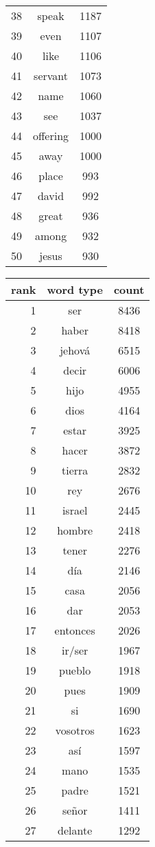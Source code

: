 \begin{figure*}
\begin{tiny}
\begin{centering}
\begin{tabular}{|r|c|c|}
38 & speak & 1187 \\
39 & even & 1107 \\
40 & like & 1106 \\
41 & servant & 1073 \\
42 & name & 1060 \\
43 & see & 1037 \\
44 & offering & 1000 \\
45 & away & 1000 \\
46 & place & 993 \\
47 & david & 992 \\
48 & great & 936 \\
49 & among & 932 \\
50 & jesus & 930 \\
    \hline
  \end{tabular}
  \quad
  \begin{tabular}{|r|c|c|}
    \hline
    rank & word type & count \\
    \hline
1 & ser & 8436 \\
2 & haber & 8418 \\
3 & jehová & 6515 \\
4 & decir & 6006 \\
5 & hijo & 4955 \\
6 & dios & 4164 \\
7 & estar & 3925 \\
8 & hacer & 3872 \\
9 & tierra & 2832 \\
10 & rey & 2676 \\
11 & israel & 2445 \\
12 & hombre & 2418 \\
13 & tener & 2276 \\
14 & día & 2146 \\
15 & casa & 2056 \\
16 & dar & 2053 \\
17 & entonces & 2026 \\
18 & ir/ser & 1967 \\
19 & pueblo & 1918 \\
20 & pues & 1909 \\
21 & si & 1690 \\
22 & vosotros & 1623 \\
23 & así & 1597 \\
24 & mano & 1535 \\
25 & padre & 1521 \\
26 & señor & 1411 \\
27 & delante & 1292 \\

\end{tabular}
\end{centering}
\end{tiny}
\end{figure*}
